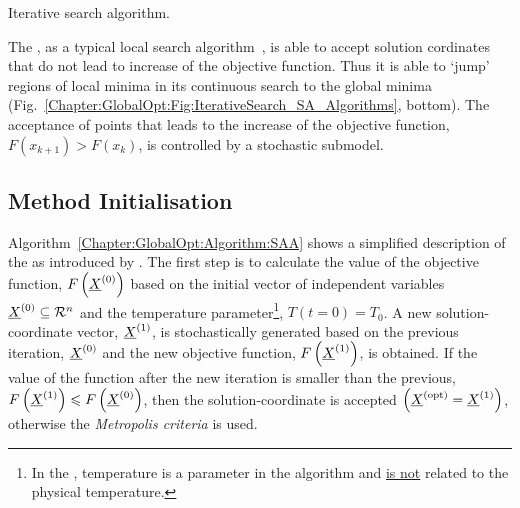 \begin{algorithm}[h]%


 \caption{Iterative search algorithm.}\label{Chapter:GlobalOpt:Algorithm:IterativeSearch}
\end{algorithm}

The \SAA, as a typical local search algorithm~\citep{Tsallis_1996,Dekkers_1991}, is able to accept solution cordinates that do not lead to increase of the objective function. Thus it is able to `jump' regions of local minima in its continuous search to the global minima (Fig.~\ref{Chapter:GlobalOpt:Fig:IterativeSearch_SA_Algorithms}, bottom). The acceptance of points that leads to the increase of the objective function, $F\left(x_{k+1}\right) > F\left(x_{k}\right)$, is controlled by a stochastic submodel.


\subsection{Method Initialisation}\label{Chapter:GlobalOpt:Section:SAA}
Algorithm~\ref{Chapter:GlobalOpt:Algorithm:SAA} shows a simplified description of the \SAA as introduced by \citet{Corana_1987}\citep[see also][]{Goffe_1994}. The first step is to calculate the value of the objective function, $F\left(\mfr[\underline{X}]{}{0}\right)$ based on the initial vector of independent variables $\mfr[\underline{X}]{}{0}\subseteq\mathcal{R}^{n}$ and the temperature parameter\footnote{In the \SAA, temperature is a parameter in the algorithm and \underline{is not} related to the physical temperature.}, $T(t=0)=T_{0}$. A new solution-coordinate vector, $\mfr[\underline{X}]{}{1}$, is stochastically generated based on the previous iteration, $\mfr[\underline{X}]{}{0}$ and the new objective function, $F\left(\mfr[\underline{X}]{}{1}\right)$, is obtained. If the value of the function after the new iteration is smaller than the previous, $F\left(\mfr[\underline{X}]{}{1}\right) \le F\left(\mfr[\underline{X}]{}{0}\right)$, then the solution-coordinate is accepted $\left(\mfr[\underline{X}]{}{\text{opt}}=\mfr[\underline{X}]{}{\text{1}}\right)$, otherwise the {\it Metropolis criteria} is used.

